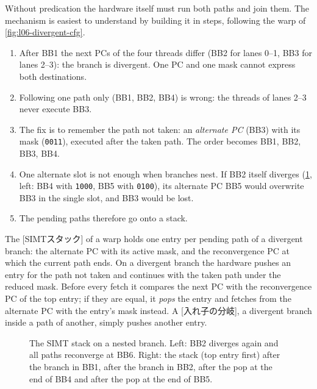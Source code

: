 \documentclass[../main.tex]{subfiles}
\begin{document}
Without predication the hardware itself must run both paths and join
them.  The mechanism is easiest to understand by building it in steps,
following the warp of \cref{fig:l06-divergent-cfg}.
\begin{enumerate}
  \item After BB1 the next PCs of the four threads differ (BB2 for
    lanes 0--1, BB3 for lanes 2--3): the branch is divergent.  One PC
    and one mask cannot express both destinations.
  \item Following one path only (BB1, BB2, BB4) is wrong: the threads
    of lanes 2--3 never execute BB3.
  \item The fix is to remember the path not taken: an \emph{alternate
    PC} (BB3) with its mask (\texttt{0011}), executed after the taken
    path.  The order becomes BB1, BB2, BB3, BB4.
  \item One alternate slot is not enough when branches nest.  If BB2
    itself diverges (\cref{fig:l06-simt-stack}, left: BB4 with
    \texttt{1000}, BB5 with \texttt{0100}), its alternate PC BB5 would
    overwrite BB3 in the single slot, and BB3 would be lost.
  \item The pending paths therefore go onto a stack.
\end{enumerate}

\begin{definition}
  \label{def:l06-simt-stack}
  The [SIMTスタック] of a warp holds one entry per
  pending path of a divergent branch: the alternate PC with its active
  mask, and the reconvergence PC at which the current path ends.  On a
  divergent branch the hardware pushes an entry for the path not taken
  and continues with the taken path under the reduced mask.  Before
  every fetch it compares the next PC with the reconvergence PC of the
  top entry; if they are equal, it \emph{pops} the entry and fetches
  from the alternate PC with the entry's mask instead.  A
  [入れ子の分岐], a divergent branch inside a path
  of another, simply pushes another entry.
\end{definition}

\begin{figure}[tb]
  \centering
  
  \caption{The SIMT stack on a nested branch.  Left: BB2 diverges again
    and all paths reconverge at BB6.  Right: the stack (top entry
    first) after the branch in BB1, after the branch in BB2, after the
    pop at the end of BB4 and after the pop at the end of BB5.}
  \label{fig:l06-simt-stack}
\end{figure}
\end{document}
